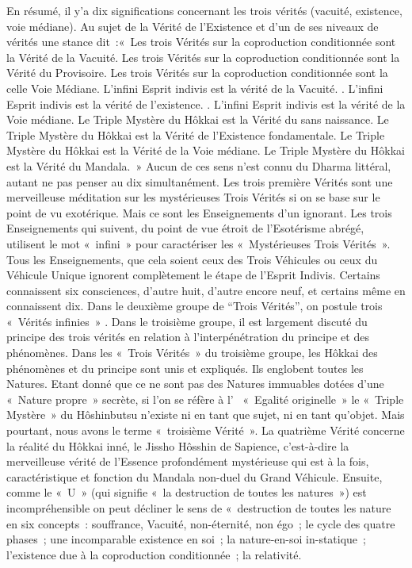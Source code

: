 En résumé, il y’a dix significations concernant les trois vérités (vacuité, existence, voie médiane).
Au sujet de la Vérité de l’Existence et d’un de  ses niveaux de vérités une stance dit :« Les trois Vérités sur la coproduction conditionnée sont la Vérité de la Vacuité. Les trois Vérités sur la coproduction conditionnée sont la Vérité du Provisoire. Les trois Vérités sur la coproduction conditionnée sont la celle Voie Médiane. L’infini Esprit indivis est la vérité de la Vacuité. . L’infini Esprit indivis est la vérité de l’existence. . L’infini Esprit indivis est la vérité de la Voie médiane. Le Triple Mystère du Hôkkai est la Vérité du sans naissance. Le Triple Mystère du Hôkkai est la Vérité de l’Existence fondamentale. Le Triple Mystère du Hôkkai est la Vérité de la Voie médiane. Le Triple Mystère du Hôkkai est la Vérité du Mandala. »  
Aucun de ces sens n’est connu du Dharma littéral, autant ne pas penser au dix simultanément. Les trois première Vérités sont une merveilleuse méditation sur les mystérieuses Trois Vérités si on se base sur le point de vu exotérique. Mais ce sont les Enseignements  d’un ignorant.
Les trois Enseignements qui suivent, du point de vue étroit de l’Esotérisme abrégé,  utilisent le mot « infini » pour caractériser les « Mystérieuses Trois Vérités ». Tous les Enseignements, que cela soient ceux des Trois Véhicules ou ceux du Véhicule Unique ignorent complètement le étape de l’Esprit Indivis. Certains connaissent  six consciences, d’autre huit, d’autre encore neuf, et certains même en connaissent dix.
Dans le deuxième groupe de “Trois Vérités”, on postule trois « Vérités infinies » . Dans le troisième groupe, il est largement discuté du principe des trois vérités en relation à l’interpénétration du principe et des phénomènes.
Dans les « Trois Vérités » du troisième groupe, les Hôkkai des phénomènes et du principe  sont unis et expliqués. Ils englobent toutes les Natures. Etant donné que ce ne sont pas des Natures immuables dotées d’une « Nature propre » secrète, si l’on se réfère à l’  « Egalité originelle » le « Triple Mystère » du Hôshinbutsu n’existe ni en tant que sujet, ni en tant qu’objet. Mais pourtant, nous avons le terme « troisième Vérité ».
La quatrième Vérité concerne la réalité du Hôkkai inné, le Jissho Hôsshin de Sapience, c'est-à-dire la  merveilleuse vérité de l’Essence profondément mystérieuse qui est à la fois, caractéristique et fonction du Mandala non-duel du Grand Véhicule.
Ensuite, comme le « U » (qui signifie « la destruction de toutes les natures ») est incompréhensible on peut décliner le sens de « destruction de toutes les nature en six concepts : souffrance, Vacuité, non-éternité, non égo ; le cycle des quatre phases ; une incomparable existence en soi ; la nature-en-soi in-statique ; l’existence due à la coproduction conditionnée ;  la relativité.
